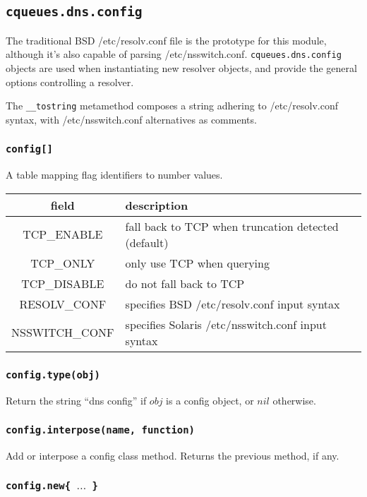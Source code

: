\documentclass[11pt, oneside]{memoir}
\newcommand*{\routine}[1]{\texttt{#1}\xspace}
\newcommand*{\fn}[1]{\texttt{#1}\xspace}
\newcommand*{\module}[1]{\texttt{#1}\xspace}
\newcounter{toccols}
\newenvironment{Module}[1]{
	\subsection{\texttt{#1}}
	\addtocontents{toc}{
		\protect\begin{multicols}{\value{toccols}}
	}
}{
	\addtocontents{toc}{\protect\end{multicols}}
}
\begin{document}
\begin{Module}{cqueues.dns.config}

The traditional BSD /etc/resolv.conf file is the prototype for this module, although it's also capable of parsing /etc/nsswitch.conf. \module{cqueues.dns.config} objects are used when instantiating new resolver objects, and provide the general options controlling a resolver.

The \fn{\_\_tostring} metamethod composes a string adhering to /etc/resolv.conf syntax, with /etc/nsswitch.conf alternatives as comments.

\subsubsection[\fn{config[]}]{\fn{config[]}}

A table mapping flag identifiers to number values.

\begin{tabular}{ c | l }
field & description\\\hline
TCP\_ENABLE & fall back to TCP when truncation detected (default)\\
TCP\_ONLY & only use TCP when querying\\
TCP\_DISABLE & do not fall back to TCP\\
RESOLV\_CONF & specifies BSD /etc/resolv.conf input syntax\\
NSSWITCH\_CONF & specifies Solaris /etc/nsswitch.conf input syntax
\end{tabular}

\subsubsection[\routine{config.type}]{\routine{config.type(obj)}}
Return the string ``dns config'' if $obj$ is a config object, or $nil$ otherwise.

\subsubsection[\fn{config.interpose}]{\fn{config.interpose(name, function)}}

Add or interpose a config class method. Returns the previous method, if any.

\subsubsection[\fn{config.new}]{\fn{config.new\{ $\ldots$ \}}}


\end{Module}
\end{document}
